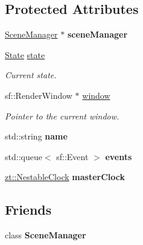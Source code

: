 \subsection*{Protected Attributes}
\begin{DoxyCompactItemize}
\item 
\mbox{\label{classzt_1_1_scene_a2a64a5a0a5c38c79416f1887ad8ddf1d}} 
\hyperlink{classzt_1_1_scene_manager}{Scene\+Manager} $\ast$ {\bfseries scene\+Manager}
\item 
\mbox{\label{classzt_1_1_scene_afa7ec29518dcf41daf6e1b33b3241ff8}} 
\hyperlink{classzt_1_1_scene_a5618d9448cd874af20a6be8ed60c87a5}{State} \hyperlink{classzt_1_1_scene_afa7ec29518dcf41daf6e1b33b3241ff8}{state}
\begin{DoxyCompactList}\small\item\em Current state. \end{DoxyCompactList}\item 
\mbox{\label{classzt_1_1_scene_a03f12b88348262d18487f2381f5874b1}} 
sf\+::\+Render\+Window $\ast$ \hyperlink{classzt_1_1_scene_a03f12b88348262d18487f2381f5874b1}{window}
\begin{DoxyCompactList}\small\item\em Pointer to the current window. \end{DoxyCompactList}\item 
\mbox{\label{classzt_1_1_scene_a4c59d38b4006405c0f5a4caae401500e}} 
std\+::string {\bfseries name}
\item 
\mbox{\label{classzt_1_1_scene_a1da96e1c8fa7b26da4504ade1bfd6c41}} 
std\+::queue$<$ sf\+::\+Event $>$ {\bfseries events}
\item 
\mbox{\label{classzt_1_1_scene_a4cc8f5e29b99c49a8edc0c8a2f535d3c}} 
\hyperlink{classzt_1_1_nestable_clock}{zt\+::\+Nestable\+Clock} {\bfseries master\+Clock}
\end{DoxyCompactItemize}
\subsection*{Friends}
\begin{DoxyCompactItemize}
\item 
\mbox{\label{classzt_1_1_scene_a284464b0561a6f2915f04b0245b987f0}} 
class {\bfseries Scene\+Manager}
\end{DoxyCompactItemize}


